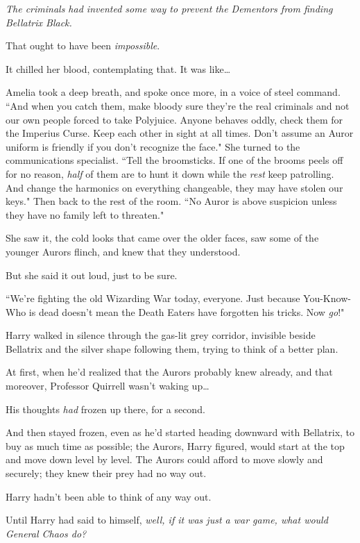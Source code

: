 \emph{The criminals had invented some way to prevent the Dementors from finding Bellatrix Black.}

That ought to have been \emph{impossible}.

It chilled her blood, contemplating that. It was like{\ldots}

Amelia took a deep breath, and spoke once more, in a voice of steel command. ``And when you catch them, make bloody sure they're the real criminals and not our own people forced to take Polyjuice. Anyone behaves oddly, check them for the Imperius Curse. Keep each other in sight at all times. Don't assume an Auror uniform is friendly if you don't recognize the face." She turned to the communications specialist. ``Tell the broomsticks. If one of the brooms peels off for no reason, \emph{half} of them are to hunt it down while the \emph{rest} keep patrolling. And change the harmonics on everything changeable, they may have stolen our keys." Then back to the rest of the room. ``No Auror is above suspicion unless they have no family left to threaten."

She saw it, the cold looks that came over the older faces, saw some of the younger Aurors flinch, and knew that they understood.

But she said it out loud, just to be sure.

``We're fighting the old Wizarding War today, everyone. Just because You-Know-Who is dead doesn't mean the Death Eaters have forgotten his tricks. Now \emph{go}!"

\later

Harry walked in silence through the gas-lit grey corridor, invisible beside Bellatrix and the silver shape following them, trying to think of a better plan.

At first, when he'd realized that the Aurors probably knew already, and that moreover, Professor Quirrell wasn't waking up{\ldots}

His thoughts \emph{had} frozen up there, for a second.

And then stayed frozen, even as he'd started heading downward with Bellatrix, to buy as much time as possible; the Aurors, Harry figured, would start at the top and move down level by level. The Aurors could afford to move slowly and securely; they knew their prey had no way out.

Harry hadn't been able to think of any way out.

Until Harry had said to himself, \emph{well, if it was just a war game, what would General Chaos do?}

